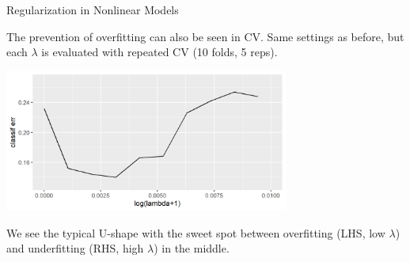 \documentclass[11pt,compress,t,notes=noshow, xcolor=table]{beamer}
\begin{document}
\begin{frame}{Regularization in Nonlinear Models}

The prevention of overfitting can also be seen in CV.
Same settings as before, but each $\lambda$ is evaluated with
repeated CV (10 folds, 5 reps). 

\begin{center}\includegraphics[width=0.7\textwidth]{figure/fig-regu-nonlin-srm-1.png}\end{center}

We see the typical U-shape with the sweet spot between overfitting (LHS, low $\lambda$) and 
underfitting (RHS, high $\lambda$) in the middle.
\end{frame}
\end{document}
